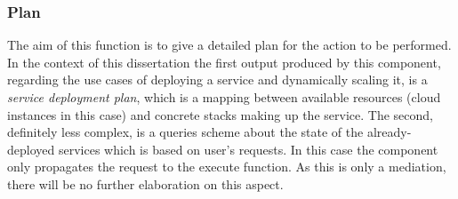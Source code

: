 \subsubsection{Plan}
The aim of this function is to give a detailed plan for the action to be performed. In the context of this dissertation the first output produced by this component, regarding the use cases of deploying a service and dynamically scaling it, is a \emph{service deployment plan}, which is a mapping between available resources (cloud instances in this case) and concrete stacks making up the service. The second, definitely less complex, is a queries scheme about the state of the already-deployed services which is based on user's requests. In this case the component only propagates the request to the execute function. As this is only a mediation, there will be no further elaboration on this aspect.


